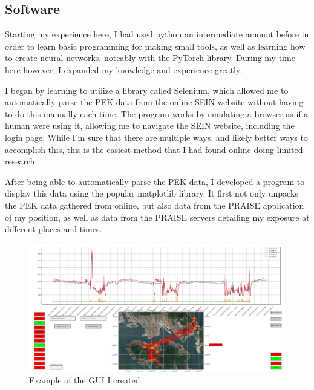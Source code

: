 \documentclass{article}
\begin{document}
\begin{multicols}{2}
\section{Software}
\label{section:Software}

Starting my experience here, I had used python an intermediate amount before in order 
to learn basic programming for making small tools, as well as learning how to create
neural networks, noteably with the PyTorch library. During my time here however, I expanded
my knowledge and experience greatly.

I began by learning to utilize a library called Selenium, which allowed me to automatically 
parse the PEK data from the online SEIN website without having to do this manually each
time. The program works by emulating a browser as if a human were using it, allowing me
to navigate the SEIN website, including the login page. While I'm sure that there are 
multiple ways, and likely better ways to accomplish this, this is the easiest method that 
I had found online doing limited research.

After being able to automatically parse the PEK data, I developed a program to display this 
data using the popular matplotlib library. It first not only unpacks the PEK data gathered 
from online, but also data from the PRAISE application of my position, as well as data from
the PRAISE servers detailing my exposure at different places and times.

\begin{figure}[H]
  \includegraphics[width=\linewidth]{GUI_example_1.png}
  \caption{\label{figure:GUI_example_1} Example of the GUI I created}
\end{figure}


\end{multicols}
\end{document}
